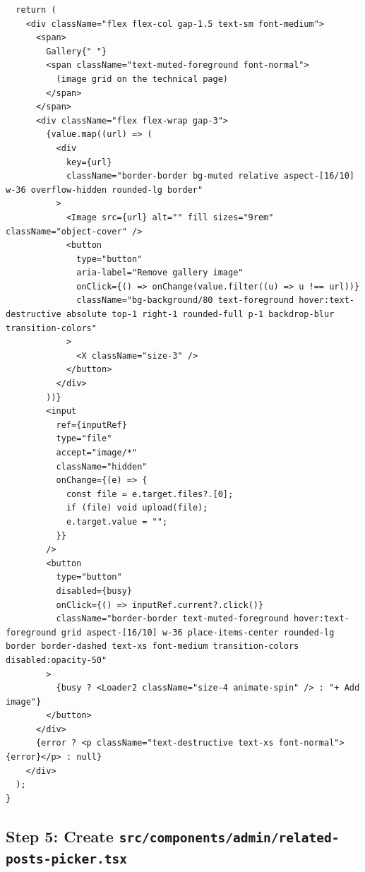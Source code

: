 \documentclass[11pt,a4paper]{article}
\begin{document}
\begin{lstlisting}
  return (
    <div className="flex flex-col gap-1.5 text-sm font-medium">
      <span>
        Gallery{" "}
        <span className="text-muted-foreground font-normal">
          (image grid on the technical page)
        </span>
      </span>
      <div className="flex flex-wrap gap-3">
        {value.map((url) => (
          <div
            key={url}
            className="border-border bg-muted relative aspect-[16/10] w-36 overflow-hidden rounded-lg border"
          >
            <Image src={url} alt="" fill sizes="9rem" className="object-cover" />
            <button
              type="button"
              aria-label="Remove gallery image"
              onClick={() => onChange(value.filter((u) => u !== url))}
              className="bg-background/80 text-foreground hover:text-destructive absolute top-1 right-1 rounded-full p-1 backdrop-blur transition-colors"
            >
              <X className="size-3" />
            </button>
          </div>
        ))}
        <input
          ref={inputRef}
          type="file"
          accept="image/*"
          className="hidden"
          onChange={(e) => {
            const file = e.target.files?.[0];
            if (file) void upload(file);
            e.target.value = "";
          }}
        />
        <button
          type="button"
          disabled={busy}
          onClick={() => inputRef.current?.click()}
          className="border-border text-muted-foreground hover:text-foreground grid aspect-[16/10] w-36 place-items-center rounded-lg border border-dashed text-xs font-medium transition-colors disabled:opacity-50"
        >
          {busy ? <Loader2 className="size-4 animate-spin" /> : "+ Add image"}
        </button>
      </div>
      {error ? <p className="text-destructive text-xs font-normal">{error}</p> : null}
    </div>
  );
}
\end{lstlisting}

\subsection*{Step 5: Create \texttt{src/components/admin/related-posts-picker.tsx}}
\end{document}
